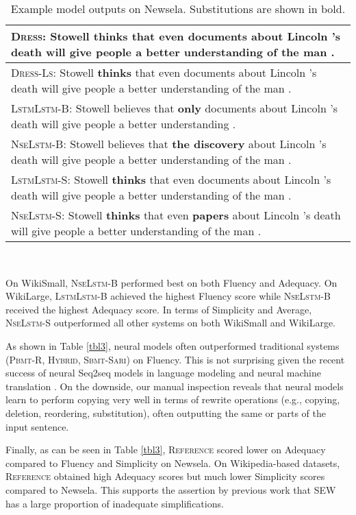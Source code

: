 \documentclass[11pt,a4paper]{article}
\begin{document}
\begin{table*}[ht!]
\begin{adjustbox}{max width=\textwidth}
\begin{tabular}{|p{21cm}|}
  \hline
  \textsc{Dress}: Stowell \textbf{thinks} that even documents about Lincoln 's death will give people a better understanding of the man .\\
  \hline
  \textsc{Dress-Ls}: Stowell \textbf{thinks} that even documents about Lincoln 's death will give people a better understanding of the man .\\
  \hline
  \textsc{LstmLstm-B}: Stowell believes that \textbf{only} documents about Lincoln 's death will give people a better understanding .\\
  \hline
  \textsc{NseLstm-B}: Stowell believes that \textbf{the discovery} about Lincoln 's death will give people a better understanding of the man .\\
  \hline
    \textsc{LstmLstm-S}: Stowell \textbf{thinks} that even documents about Lincoln 's death will give people a better understanding of the man .\\
  \hline
    \textsc{NseLstm-S}: Stowell \textbf{thinks} that even \textbf{papers} about Lincoln 's death will give people a better understanding of the man .\\
  \hline
\end{tabular}\end{adjustbox}
\\[3mm]
\caption{Example model outputs on Newsela. Substitutions are shown in bold.}
\label{tbl4}
\vspace*{-2mm}
\end{table*}

On WikiSmall, \textsc{NseLstm-B} performed best on both Fluency and Adequacy. On WikiLarge, \textsc{LstmLstm-B} achieved the highest Fluency score while \textsc{NseLstm-B} received the highest Adequacy score. In terms of Simplicity and Average, \textsc{NseLstm-S} outperformed all other systems on both WikiSmall and WikiLarge.

As shown in Table \ref{tbl3}, neural models often outperformed traditional systems (\textsc{Pbmt-R}, \textsc{Hybrid}, \textsc{Sbmt-Sari}) on Fluency. This is not surprising given the recent success of neural Seq2seq models in language modeling and neural machine translation \cite{Zaremba:14,Jean:15}. On the downside, our manual inspection reveals that neural models learn to perform copying very well in terms of rewrite operations (e.g., copying, deletion, reordering, substitution), often outputting the same or parts of the input sentence.

Finally, as can be seen in Table \ref{tbl3}, \textsc{Reference} scored lower on Adequacy compared to Fluency and Simplicity on Newsela. On Wikipedia-based datasets, \textsc{Reference} obtained high Adequacy scores but much lower Simplicity scores compared to Newsela. This supports the assertion by previous work \cite{Xu:15} that SEW has a large proportion of inadequate simplifications.
\end{document}
